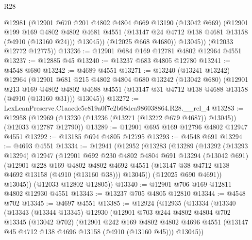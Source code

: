 \begin{lexlean}{R28}
\begin{coremodule}
            @12981
            (@12901
              @670
              @201
              @4802
              @4804
              @669
              @13190
              (@13042 @669)
              (@12901
                @199
                @169
                @4802
                @4802
                @4681
                @4551
                (@13147 @24 @4712 @138 @4681 @13158 (@4910 (@13160 @24)))
                @13045))
            (@12025 @668 @4680))
          @13045))
      (@12033 @12772 @12775))
@13236 := @12901 @684 @169 @12781 @4802 @12964 @4551
@13237 := @12885 @45
@13240 := @13237 @683 @4805 @12780
@13241 := @4548 @680
@13242 := @4689 @4551
@13271 := @13240
    (@13241 @13242)
    @12964
    (@12901
      @681
      @215
      @4802
      @4804
      @680
      @13242
      (@13042 @680)
      (@12901
        @213
        @169
        @4802
        @4802
        @4688
        @4551
        (@13147 @31 @4712 @138 @4688 @13158 (@4910 (@13160 @31)))
        @13045))
@13272 := LexLeanPreserve.C1aacde5c819a0f7e2b68dca986038864.R28.__rel_4
@13283 := @12958
    (@12969 (@13230 (@13236 (@13271 (@13272 @679 @4687)) @13045)) (@12033 @12787 @12790))
@13289 := @12901 @695 @169 @12796 @4802 @12947 @4551
@13292 := @13185 @694 @4805 @12795
@13293 := @4548 @691
@13294 := @4693 @4551
@13334 := @12941
    (@12952
      (@13283
        (@13289
          (@13292
            (@13293 @13294)
            @12947
            (@12901
              @692
              @230
              @4802
              @4804
              @691
              @13294
              (@13042 @691)
              (@12901
                @228
                @169
                @4802
                @4802
                @4692
                @4551
                (@13147 @38 @4712 @138 @4692 @13158 (@4910 (@13160 @38)))
                @13045))
            (@12025 @690 @4691))
          @13045))
      (@12033 @12802 @12805))
@13340 := @12901 @706 @169 @12811 @4802 @12930 @4551
@13343 := @13237 @705 @4805 @12810
@13344 := @4548 @702
@13345 := @4697 @4551
@13385 := @12924
    (@12935
      (@13334
        (@13340
          (@13343
            (@13344 @13345)
            @12930
            (@12901
              @703
              @244
              @4802
              @4804
              @702
              @13345
              (@13042 @702)
              (@12901
                @242
                @169
                @4802
                @4802
                @4696
                @4551
                (@13147 @45 @4712 @138 @4696 @13158 (@4910 (@13160 @45)))
                @13045))

\end{coremodule}
\end{lexlean}
